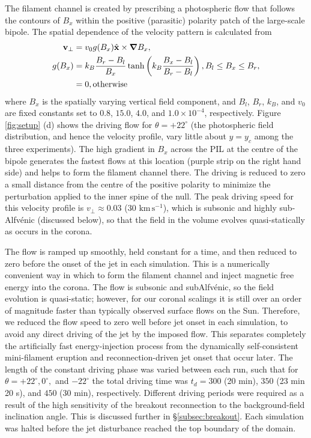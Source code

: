 \documentclass[twocolumn]{aastex6}
\begin{document}
The filament channel is created by prescribing a photospheric flow that follows the contours of $B_{x}$ within the positive (parasitic) polarity patch of the large-scale bipole. The spatial dependence of the velocity pattern is calculated from \citep{Wyper2016}
\begin{align}
\mathbf{v}_{\perp} &= v_{0}g(B_x)\hat{\mathbf{x}}\times \boldsymbol{\nabla} B_{x},\\
g(B_x) &= k_{B}\frac{B_{r}-B_{l}}{B_{x}}\tanh\left(k_{B}\frac{B_{x}-B_{l}}{B_{r}-B_{l}}\right), B_l \le B_x \le B_r,\\
       &= 0, {\rm otherwise}\nonumber
\label{eq:vdef}
\end{align}
where $B_x$ is the spatially varying vertical field component, and $B_l$, $B_r$, $k_B$, and $v_0$ are fixed constants set to $0.8$, $15.0$, $4.0$, and $1.0\times 10^{-4}$, respectively. Figure \ref{fig:setup} (d) shows the driving flow for $\theta = +22^\circ$ (the photospheric field distribution, and hence the velocity profile, vary little about $y = y_c$ among the three experiments). The high gradient in $B_{x}$ across the PIL at the centre of the bipole generates the fastest flows at this location (purple strip on the right hand side) and helps to form the filament channel there. The driving is reduced to zero a small distance from the centre of the positive polarity to minimize the perturbation applied to the inner spine of the null. The peak driving speed for this velocity profile is $v_{\perp} \approx 0.03$ {($30 \text{ km}\,\text{s}^{-1}$)}, which is subsonic and highly sub-Alfv\'{e}nic (discussed below), so that the field in the volume evolves quasi-statically as occurs in the corona. 


The flow is ramped up smoothly, held constant for a time, and then reduced to zero before the onset of the jet in each simulation. {This is a numerically convenient way in which to form the filament channel and inject magnetic free energy into the corona. The flow is subsonic and subAlfv\'{e}nic, so the field evolution is quasi-static; however, for our coronal scalings it is still over an order of magnitude faster than typically observed surface flows on the Sun. Therefore, we reduced the flow speed to zero well before jet onset in each simulation, to avoid any direct driving of the jet by the imposed flow. This separates completely the artificially fast energy-injection process from the dynamically self-consistent mini-filament eruption and reconnection-driven jet onset that occur later.} The length of the constant driving phase was varied between each run, such that for $\theta=+22^\circ, 0^\circ,$ and $-22^\circ$ the total driving time was $t_{d} = 300$ {(20 min)}, $350$ {(23 min 20 s)}, and $450$ {(30 min)}, respectively. Different driving periods were required as a result of the high sensitivity of the breakout reconnection to the background-field inclination angle. This is discussed further in \S \ref{subsec:breakout}. Each simulation was halted before the jet disturbance reached the top boundary of the domain. 
\end{document}
